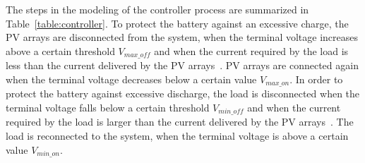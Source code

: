 The steps in the modeling of the controller process are summarized in Table~\ref{table:controller}. To protect the battery against an excessive charge, the PV arrays are disconnected from the system, when the terminal voltage increases above a certain threshold $V_{max \_ off}$ and when the current required by the load is less than the current delivered by the PV arrays~\cite{Hansen}. PV arrays are connected again when the terminal voltage decreases below a certain value $ V_{max \_ on} $. 
%
%
In order to protect the battery against excessive discharge, the load is disconnected when the terminal voltage falls below a certain threshold $V_{min \_ off}$ and when the current required by the load is larger than the current delivered by the PV arrays~\cite{Hansen}. The load is reconnected to the system, when the terminal voltage is above a certain value $V_{min \_ on}$.
%
%
%
